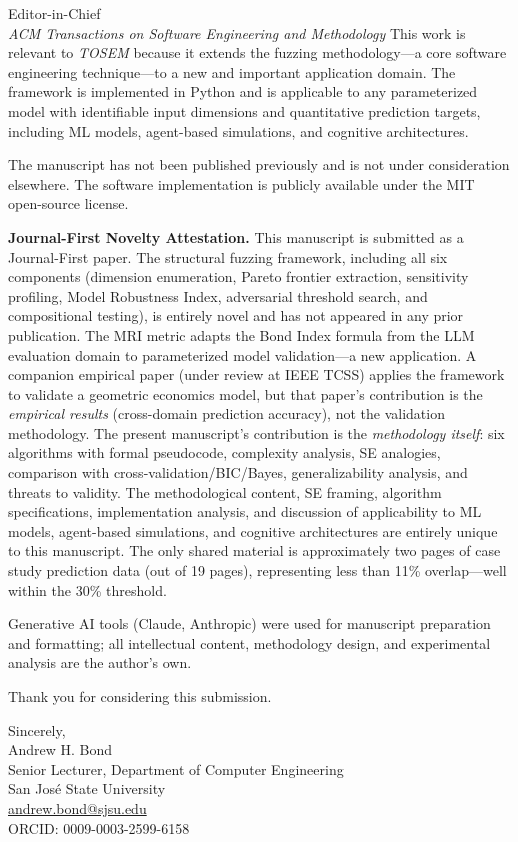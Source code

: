 \documentclass[12pt]{letter}
\begin{document}
\begin{letter}{%
Editor-in-Chief\\
\emph{ACM Transactions on Software Engineering and Methodology}}
This work is relevant to \emph{TOSEM} because it extends the fuzzing methodology---a core software engineering technique---to a new and important application domain.  The framework is implemented in Python and is applicable to any parameterized model with identifiable input dimensions and quantitative prediction targets, including ML models, agent-based simulations, and cognitive architectures.

The manuscript has not been published previously and is not under consideration elsewhere.  The software implementation is publicly available under the MIT open-source license.

\medskip
\noindent\textbf{Journal-First Novelty Attestation.}
This manuscript is submitted as a Journal-First paper.  The structural fuzzing framework, including all six components (dimension enumeration, Pareto frontier extraction, sensitivity profiling, Model Robustness Index, adversarial threshold search, and compositional testing), is entirely novel and has not appeared in any prior publication.  The MRI metric adapts the Bond Index formula from the LLM evaluation domain to parameterized model validation---a new application.  A companion empirical paper (under review at IEEE TCSS) applies the framework to validate a geometric economics model, but that paper's contribution is the \emph{empirical results} (cross-domain prediction accuracy), not the validation methodology.  The present manuscript's contribution is the \emph{methodology itself}: six algorithms with formal pseudocode, complexity analysis, SE analogies, comparison with cross-validation/BIC/Bayes, generalizability analysis, and threats to validity.  The methodological content, SE framing, algorithm specifications, implementation analysis, and discussion of applicability to ML models, agent-based simulations, and cognitive architectures are entirely unique to this manuscript.  The only shared material is approximately two pages of case study prediction data (out of 19 pages), representing less than 11\% overlap---well within the 30\% threshold.

\medskip
Generative AI tools (Claude, Anthropic) were used for manuscript preparation and formatting; all intellectual content, methodology design, and experimental analysis are the author's own.

Thank you for considering this submission.

\closing{Sincerely,\\[2em]
Andrew H. Bond\\
Senior Lecturer, Department of Computer Engineering\\
San Jos\'{e} State University\\
\href{mailto:andrew.bond@sjsu.edu}{andrew.bond@sjsu.edu}\\
ORCID: 0009-0003-2599-6158}

\end{letter}
\end{document}

